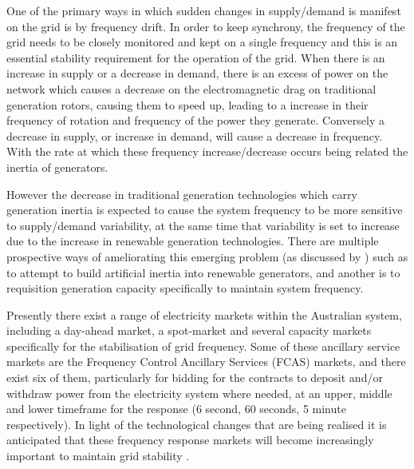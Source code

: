 One of the primary ways in which sudden changes in supply/demand is manifest on the grid is by frequency drift.
In order to keep synchrony, the frequency of the grid needs to be closely monitored and kept on a single frequency and this is an essential stability requirement for the operation of the grid.
When there is an increase in supply or a decrease in demand, there is an excess of power on the network which causes a decrease on the electromagnetic drag on traditional generation rotors, causing them to speed up, leading to a increase in their frequency of rotation and frequency of the power they generate.
Conversely a decrease in supply, or increase in demand, will cause a decrease in frequency. With the rate at which these frequency increase/decrease occurs being related the inertia of generators.

However the decrease in traditional generation technologies which carry generation inertia is expected to cause the system frequency to be more sensitive to supply/demand variability, at the same time that variability is set to increase due to the increase in renewable generation technologies.
There are multiple prospective ways of ameliorating this emerging problem (as discussed by \cite{doi:10.1002/2050-7038.12128}) such as to attempt to build artificial inertia into renewable generators, and another is to requisition generation capacity specifically to maintain system frequency.

Presently there exist a range of electricity markets within the Australian system, including a day-ahead market, a spot-market and several capacity markets specifically for the stabilisation of grid frequency.
Some of these ancillary service markets are the Frequency Control Ancillary Services (FCAS) markets, and there exist six of them, particularly for bidding for the contracts to deposit and/or withdraw power from the electricity system where needed, at an upper, middle and lower timeframe for the response (6 second, 60 seconds, 5 minute respectively).
In light of the technological changes that are being realised it is anticipated that these frequency response markets will become increasingly important to maintain grid stability \citep{RIESZ201586}.

